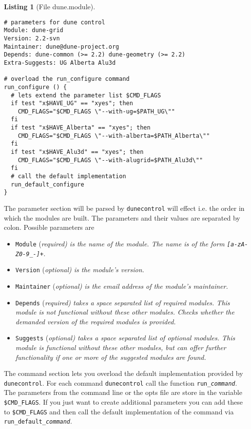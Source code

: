 \documentclass[11pt,a4paper,headinclude,footinclude,DIV16,normalheadings]{scrartcl}
\newtheorem{lst}{Listing}
\newcommand{\dunecontrol}{\texttt{dunecontrol}\xspace}
\begin{document}
\begin{lst}[File dune.module] \mbox{}
\begin{lstlisting}
# parameters for dune control
Module: dune-grid
Version: 2.2-svn
Maintainer: dune@dune-project.org
Depends: dune-common (>= 2.2) dune-geometry (>= 2.2)
Extra-Suggests: UG Alberta Alu3d

# overload the run_configure command
run_configure () {
  # lets extend the parameter list $CMD_FLAGS
  if test "x$HAVE_UG" == "xyes"; then
    CMD_FLAGS="$CMD_FLAGS \"--with-ug=$PATH_UG\""
  fi
  if test "x$HAVE_Alberta" == "xyes"; then
    CMD_FLAGS="$CMD_FLAGS \"--with-alberta=$PATH_Alberta\""
  fi  
  if test "x$HAVE_Alu3d" == "xyes"; then
    CMD_FLAGS="$CMD_FLAGS \"--with-alugrid=$PATH_Alu3d\""
  fi
  # call the default implementation
  run_default_configure
}
\end{lstlisting}
\end{lst}

The parameter section will be parsed by \dunecontrol will effect
i.e. the order in which the modules are built. The parameters and
their values are separated by colon. Possible parameters are
\begin{itemize}
\item \texttt{Module} (\em required\em) is the name of the module. The
  name is of the form \texttt{[a-zA-Z0-9\_-]+}.
\item \texttt{Version} (\em optional\em) is the module's version.
\item \texttt{Maintainer} (\em optional\em) is the email address of the 
  module's maintainer.
\item \texttt{Depends} (\em required\em) takes a space separated list
  of required modules. This module is not functional without these
  other modules. Checks whether the demanded version of the required
  modules is provided.
\item \texttt{Suggests} (\em optional\em) takes a space separated list
  of optional modules. This module is functional without these
  other modules, but can offer further functionality if one or more of
  the suggested modules are found.
\end{itemize}

The command section lets you overload the default implementation
provided by \dunecontrol. For each command \dunecontrol call the
function \texttt{run\_\textit{command}}. The parameters from the
command line or the opts file are store in the variable
\texttt{\$CMD\_FLAGS}. If you just want to create additional parameters
you can add these to \texttt{\$CMD\_FLAGS} and then call the default
implementation of the command via
\texttt{run\_default\_\textit{command}}.
\end{document}
